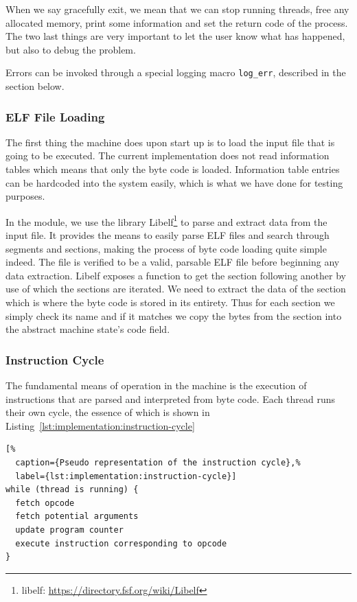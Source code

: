 When we say gracefully exit, we mean that we can stop running threads, free any
allocated memory, print some information and set the return code of the
process. The two last things are very important to let the user know what has
happened, but also to debug the problem.

Errors can be invoked through a special logging macro {\tt log\_err}, described
in the  section
below.

\subsubsection{ELF File Loading}

The first thing the machine does upon start up is to load the input file that is
going to be executed. The current implementation does not read information
tables which means that only the byte code is loaded. Information table entries
can be hardcoded into the system easily, which is what we have done for testing
purposes.

In the  module, we use the library Libelf\footnote{libelf:
  \url{https://directory.fsf.org/wiki/Libelf}} to parse and extract data from
the input file. It provides the means to easily parse ELF files and search
through segments and sections, making the process of byte code loading quite
simple indeed. The file is verified to be a valid, parsable ELF file before
beginning any data extraction. Libelf exposes a function to get the section
following another by use of which the sections are iterated. We need to extract
the data of the  section which is where the byte code is stored in
its entirety. Thus for each section we simply check its name and if it matches
we copy the bytes from the section into the abstract machine state's code field.

\subsubsection{Instruction Cycle}

The fundamental means of operation in the machine is the execution of
instructions that are parsed and interpreted from byte code. Each thread runs
their own cycle, the essence of which is shown in
Listing~\ref{lst:implementation:instruction-cycle}

\begin{minipage}{\linewidth}
\begin{lstlisting}[%
  caption={Pseudo representation of the instruction cycle},%
  label={lst:implementation:instruction-cycle}]
while (thread is running) {
  fetch opcode
  fetch potential arguments
  update program counter
  execute instruction corresponding to opcode
}
\end{lstlisting}
\end{minipage}

